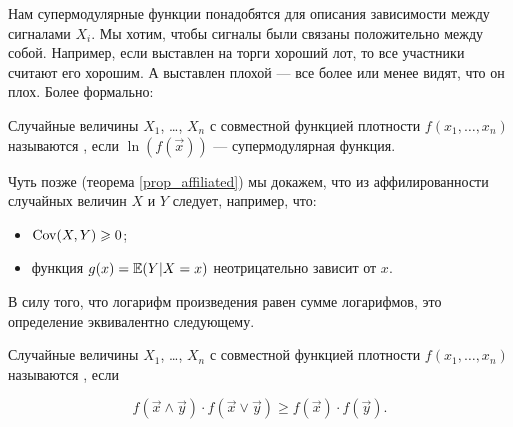 Нам супермодулярные функции понадобятся для описания зависимости между сигналами  $X_{i}$. Мы хотим, чтобы сигналы были связаны положительно между собой. Например, если выставлен на торги хороший лот, то все участники считают его хорошим. А выставлен плохой — все более или менее видят, что он плох. Более формально:


\begin{mydef}
Случайные величины $ X_{1} $, \ldots, $ X_{n} $ с совместной функцией плотности $ f(x_{1},\ldots,x_{n}) $ называются , если $ \ln(f(\vec{x})) $ — супермодулярная функция.
\end{mydef}

Чуть позже (теорема \ref{prop_affiliated}) мы докажем, что из аффилированности случайных величин $ X $ и $ Y $ следует, например, что:
\begin{itemize}
\item $\operatorname{Cov}(X,Y)\geqslant 0 $;
\item функция $g(x)= \operatorname{\mathbb{E}}(Y|X=x) $ неотрицательно зависит от $ x $.
\end{itemize}

В силу того, что логарифм произведения равен сумме логарифмов, это определение эквивалентно следующему.
\begin{mydef}
Случайные величины $ X_{1} $, \ldots, $ X_{n} $ с совместной функцией плотности $ f(x_{1},\ldots,x_{n}) $ называются , если

\begin{equation}
f(\vec{x}\wedge\vec{y})\cdot f(\vec{x}\vee\vec{y})\geq f(\vec{x})\cdot f(\vec{y}).
\end{equation}
\end{mydef}











